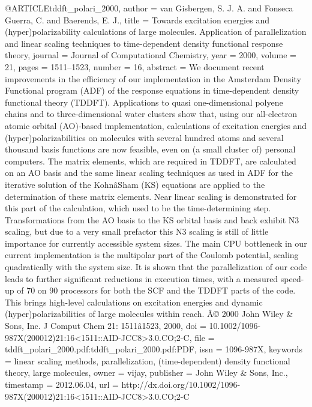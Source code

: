 @ARTICLE{tddft_polari_2000,
  author = {van Gisbergen, S. J. A. and Fonseca Guerra, C. and Baerends, E. J.},
  title = {Towards excitation energies and (hyper)polarizability calculations
	of large molecules. Application of parallelization and linear scaling
	techniques to time-dependent density functional response theory},
  journal = {Journal of Computational Chemistry},
  year = {2000},
  volume = {21},
  pages = {1511--1523},
  number = {16},
  abstract = {We document recent improvements in the efficiency of our implementation
	in the Amsterdam Density Functional program (ADF) of the response
	equations in time-dependent density functional theory (TDDFT). Applications
	to quasi one-dimensional polyene chains and to three-dimensional
	water clusters show that, using our all-electron atomic orbital (AO)-based
	implementation, calculations of excitation energies and (hyper)polarizabilities
	on molecules with several hundred atoms and several thousand basis
	functions are now feasible, even on (a small cluster of) personal
	computers. The matrix elements, which are required in TDDFT, are
	calculated on an AO basis and the same linear scaling techniques
	as used in ADF for the iterative solution of the KohnâSham (KS)
	equations are applied to the determination of these matrix elements.
	Near linear scaling is demonstrated for this part of the calculation,
	which used to be the time-determining step. Transformations from
	the AO basis to the KS orbital basis and back exhibit N3 scaling,
	but due to a very small prefactor this N3 scaling is still of little
	importance for currently accessible system sizes. The main CPU bottleneck
	in our current implementation is the multipolar part of the Coulomb
	potential, scaling quadratically with the system size. It is shown
	that the parallelization of our code leads to further significant
	reductions in execution times, with a measured speed-up of 70 on
	90 processors for both the SCF and the TDDFT parts of the code. This
	brings high-level calculations on excitation energies and dynamic
	(hyper)polarizabilities of large molecules within reach. Â© 2000
	John Wiley & Sons, Inc. J Comput Chem 21: 1511â1523, 2000},
  doi = {10.1002/1096-987X(200012)21:16<1511::AID-JCC8>3.0.CO;2-C},
  file = {tddft_polari_2000.pdf:tddft_polari_2000.pdf:PDF},
  issn = {1096-987X},
  keywords = {linear scaling methods, parallelization, (time-dependent) density
	functional theory, large molecules},
  owner = {vijay},
  publisher = {John Wiley \& Sons, Inc.},
  timestamp = {2012.06.04},
  url = {http://dx.doi.org/10.1002/1096-987X(200012)21:16<1511::AID-JCC8>3.0.CO;2-C}
}

